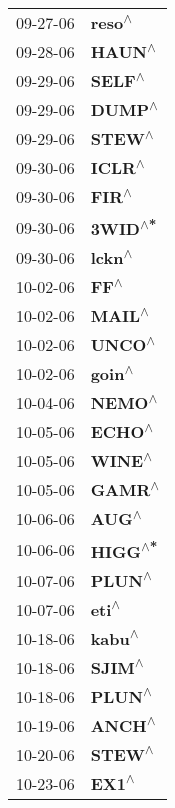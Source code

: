 \begin{supertabular}{p{0.08\textwidth}p{0.2\textwidth}}
 09-27-06 &    \textbf{reso\textsuperscript{$\wedge$}} \\
 09-28-06 &    \textbf{HAUN\textsuperscript{$\wedge$}} \\
 09-29-06 &    \textbf{SELF\textsuperscript{$\wedge$}} \\
 09-29-06 &    \textbf{DUMP\textsuperscript{$\wedge$}} \\
 09-29-06 &    \textbf{STEW\textsuperscript{$\wedge$}} \\
 09-30-06 &    \textbf{ICLR\textsuperscript{$\wedge$}} \\
 09-30-06 &     \textbf{FIR\textsuperscript{$\wedge$}} \\
 09-30-06 &   \textbf{3WID\textsuperscript{$\wedge$*}} \\
 09-30-06 &    \textbf{lckn\textsuperscript{$\wedge$}} \\
 10-02-06 &      \textbf{FF\textsuperscript{$\wedge$}} \\
 10-02-06 &    \textbf{MAIL\textsuperscript{$\wedge$}} \\
 10-02-06 &    \textbf{UNCO\textsuperscript{$\wedge$}} \\
 10-02-06 &    \textbf{goin\textsuperscript{$\wedge$}} \\
 10-04-06 &    \textbf{NEMO\textsuperscript{$\wedge$}} \\
 10-05-06 &    \textbf{ECHO\textsuperscript{$\wedge$}} \\
 10-05-06 &    \textbf{WINE\textsuperscript{$\wedge$}} \\
 10-05-06 &    \textbf{GAMR\textsuperscript{$\wedge$}} \\
 10-06-06 &     \textbf{AUG\textsuperscript{$\wedge$}} \\
 10-06-06 &   \textbf{HIGG\textsuperscript{$\wedge$*}} \\
 10-07-06 &    \textbf{PLUN\textsuperscript{$\wedge$}} \\
 10-07-06 &     \textbf{eti\textsuperscript{$\wedge$}} \\
 10-18-06 &    \textbf{kabu\textsuperscript{$\wedge$}} \\
 10-18-06 &    \textbf{SJIM\textsuperscript{$\wedge$}} \\
 10-18-06 &    \textbf{PLUN\textsuperscript{$\wedge$}} \\
 10-19-06 &    \textbf{ANCH\textsuperscript{$\wedge$}} \\
 10-20-06 &    \textbf{STEW\textsuperscript{$\wedge$}} \\
 10-23-06 &     \textbf{EX1\textsuperscript{$\wedge$}} \\

\end{supertabular}
